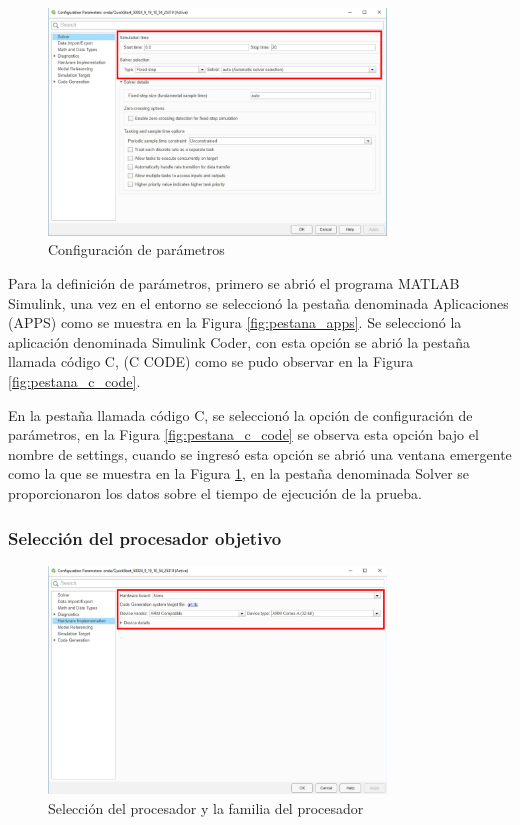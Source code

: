 \begin{figure}[h!]
    \centering
    \includegraphics[width=0.8\textwidth]{fig/especifico_2/M2MT/paso_a_paso_mtmt/configuration_parameters.pdf}
    \caption{Configuración de parámetros}
    \label{fig:pestana_config}
\end{figure}


Para la definición de parámetros, primero se abrió el programa MATLAB Simulink, una vez en el entorno se seleccionó la pestaña denominada Aplicaciones (APPS) como se muestra en la Figura \ref{fig:pestana_apps}. Se seleccionó la aplicación denominada Simulink Coder, con esta opción se abrió la pestaña llamada código C, (C CODE) como se pudo observar en la Figura \ref{fig:pestana_c_code}.

En la pestaña llamada código C, se seleccionó la opción de configuración de parámetros, en la Figura \ref{fig:pestana_c_code} se observa esta opción bajo el nombre de settings, cuando se ingresó esta opción se abrió una ventana emergente como la que se muestra en la Figura \ref{fig:pestana_config}, en la pestaña denominada Solver se proporcionaron los datos sobre el tiempo de ejecución de la prueba.

\subsubsection{Selección del procesador objetivo}

\begin{figure}[h!]
    \centering
    \includegraphics[width=0.8\textwidth]{fig/especifico_2/M2MT/paso_a_paso_mtmt/configuration_parameters_processor.pdf}
    \caption{Selección del procesador y la familia del procesador}
    \label{fig:pestana_config_procesador}
\end{figure}

